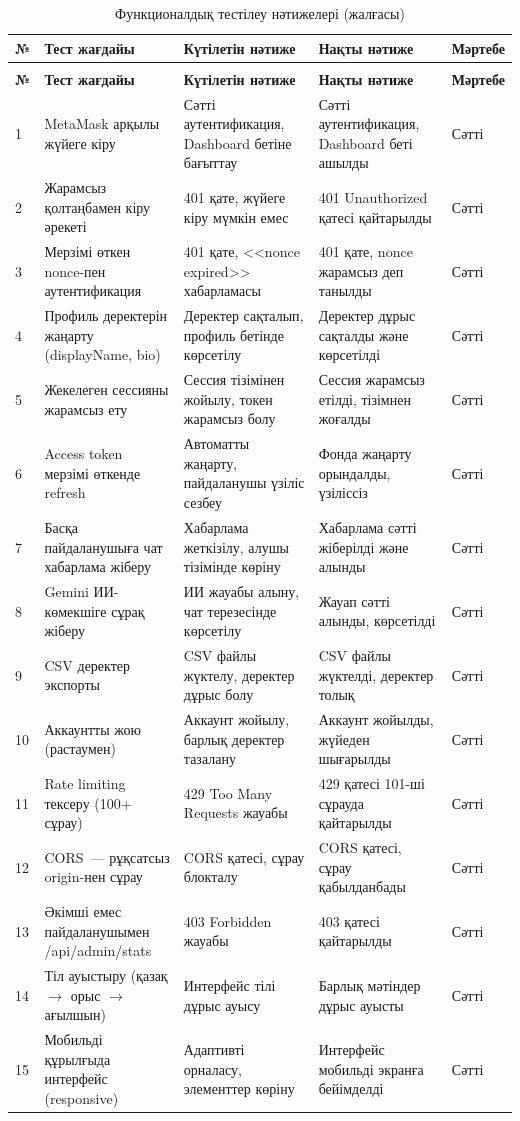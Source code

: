 \documentclass[14pt,a4paper]{extarticle}
\begin{document}
\begin{longtable}{|p{0.8cm}|p{3.5cm}|p{3.5cm}|p{3.5cm}|p{1.8cm}|}
\caption{Функционалдық тестілеу нәтижелері}\label{tab:testing}\\\hline
\textbf{№} & \textbf{Тест жағдайы} & \textbf{Күтілетін нәтиже} & \textbf{Нақты нәтиже} & \textbf{Мәртебе}\\\hline
\endfirsthead
\caption{Функционалдық тестілеу нәтижелері (жалғасы)}\\\hline
\textbf{№} & \textbf{Тест жағдайы} & \textbf{Күтілетін нәтиже} & \textbf{Нақты нәтиже} & \textbf{Мәртебе}\\\hline
\endhead
1 & MetaMask арқылы жүйеге кіру & Сәтті аутентификация, Dashboard бетіне бағыттау & Сәтті аутентификация, Dashboard беті ашылды & Сәтті\\\hline
2 & Жарамсыз қолтаңбамен кіру әрекеті & 401 қате, жүйеге кіру мүмкін емес & 401 Unauthorized қатесі қайтарылды & Сәтті\\\hline
3 & Мерзімі өткен nonce-пен аутентификация & 401 қате, <<nonce expired>> хабарламасы & 401 қате, nonce жарамсыз деп танылды & Сәтті\\\hline
4 & Профиль деректерін жаңарту (displayName, bio) & Деректер сақталып, профиль бетінде көрсетілу & Деректер дұрыс сақталды және көрсетілді & Сәтті\\\hline
5 & Жекелеген сессияны жарамсыз ету & Сессия тізімінен жойылу, токен жарамсыз болу & Сессия жарамсыз етілді, тізімнен жоғалды & Сәтті\\\hline
6 & Access token мерзімі өткенде refresh & Автоматты жаңарту, пайдаланушы үзіліс сезбеу & Фонда жаңарту орындалды, үзіліссіз & Сәтті\\\hline
7 & Басқа пайдаланушыға чат хабарлама жіберу & Хабарлама жеткізілу, алушы тізімінде көріну & Хабарлама сәтті жіберілді және алынды & Сәтті\\\hline
8 & Gemini ИИ-көмекшіге сұрақ жіберу & ИИ жауабы алыну, чат терезесінде көрсетілу & Жауап сәтті алынды, көрсетілді & Сәтті\\\hline
9 & CSV деректер экспорты & CSV файлы жүктелу, деректер дұрыс болу & CSV файлы жүктелді, деректер толық & Сәтті\\\hline
10 & Аккаунтты жою (растаумен) & Аккаунт жойылу, барлық деректер тазалану & Аккаунт жойылды, жүйеден шығарылды & Сәтті\\\hline
11 & Rate limiting тексеру (100+ сұрау) & 429 Too Many Requests жауабы & 429 қатесі 101-ші сұрауда қайтарылды & Сәтті\\\hline
12 & CORS~--- рұқсатсыз origin-нен сұрау & CORS қатесі, сұрау блокталу & CORS қатесі, сұрау қабылданбады & Сәтті\\\hline
13 & Әкімші емес пайдаланушымен /api/admin/stats & 403 Forbidden жауабы & 403 қатесі қайтарылды & Сәтті\\\hline
14 & Тіл ауыстыру (қазақ $\to$ орыс $\to$ ағылшын) & Интерфейс тілі дұрыс ауысу & Барлық мәтіндер дұрыс ауысты & Сәтті\\\hline
15 & Мобильді құрылғыда интерфейс (responsive) & Адаптивті орналасу, элементтер көріну & Интерфейс мобильді экранға бейімделді & Сәтті\\\hline
\end{longtable}
\end{document}
